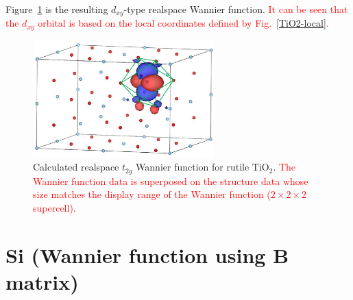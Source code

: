 \documentclass{article}
\newcommand{\tr}[1]{\textcolor{red}{#1}}
\begin{document}
Figure~\ref{vesta-TiO2} is the resulting $d_{xy}$-type realspace Wannier function. \tr{It can be seen that the $d_{xy}$ orbital is based on the local coordinates defined by Fig.~\ref{TiO2-local}.} 
\begin{figure}[H] 
\centering
\includegraphics[width=7cm]{dat.wan-realspace-TiO2.eps}
\caption{Calculated realspace $t_{2g}$ Wannier function for rutile TiO$_2$. \tr{The Wannier function data is superposed on the structure data whose size matches the display range of the Wannier function ($2\times2\times2$ supercell).}}
\label{vesta-TiO2}
\end{figure}

\clearpage 

\section{\label{Si}Si (Wannier function using B matrix)} 
\end{document}

